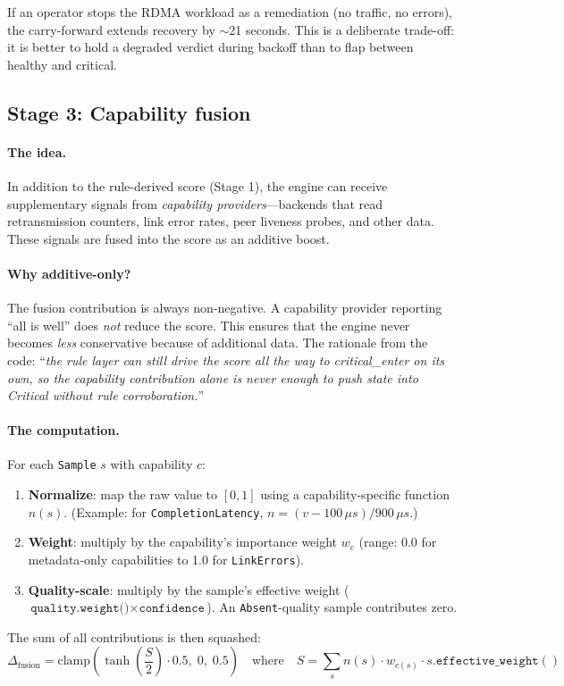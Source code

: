 \documentclass[11pt]{article}
\begin{document}
\begin{warningbox}
  If an operator stops the RDMA workload as a remediation (no traffic, no
  errors), the carry-forward extends recovery by $\sim$21 seconds. This is
  a deliberate trade-off: it is better to hold a degraded verdict during
  backoff than to flap between healthy and critical.
\end{warningbox}

\subsection{Stage 3: Capability fusion}
\label{sec:fusion}

\paragraph{The idea.}
In addition to the rule-derived score (Stage 1), the engine can receive
supplementary signals from \textit{capability providers}---backends that
read retransmission counters, link error rates, peer liveness probes, and
other data. These signals are fused into the score as an additive boost.

\paragraph{Why additive-only?}
The fusion contribution is always non-negative. A capability provider
reporting ``all is well'' does \emph{not} reduce the score. This ensures that
the engine never becomes \emph{less} conservative because of additional data.
The rationale from the code: ``\textit{the rule layer can still drive the score
all the way to critical\_enter on its own, so the capability contribution alone
is never enough to push state into Critical without rule corroboration.}''

\paragraph{The computation.}
For each \texttt{Sample} $s$ with capability $c$:
\begin{enumerate}[nosep]
  \item \textbf{Normalize}: map the raw value to $[0, 1]$ using a
        capability-specific function $n(s)$.
        (Example: for \texttt{CompletionLatency}, $n = (v - 100\,\mu s) / 900\,\mu s$.)
  \item \textbf{Weight}: multiply by the capability's importance weight $w_c$
        (range: 0.0 for metadata-only capabilities to 1.0 for
        \texttt{LinkErrors}).
  \item \textbf{Quality-scale}: multiply by the sample's effective weight
        ($\texttt{quality.weight()} \times \texttt{confidence}$). An
        \texttt{Absent}-quality sample contributes zero.
\end{enumerate}
The sum of all contributions is then squashed:
\[
  \Delta_{\text{fusion}} = \text{clamp}\!\left(\tanh\!\left(\frac{S}{2}\right) \cdot 0.5,\; 0,\; 0.5\right)
  \quad\text{where}\quad
  S = \sum_s n(s) \cdot w_{c(s)} \cdot s.\texttt{effective\_weight}()
\]
\end{document}
